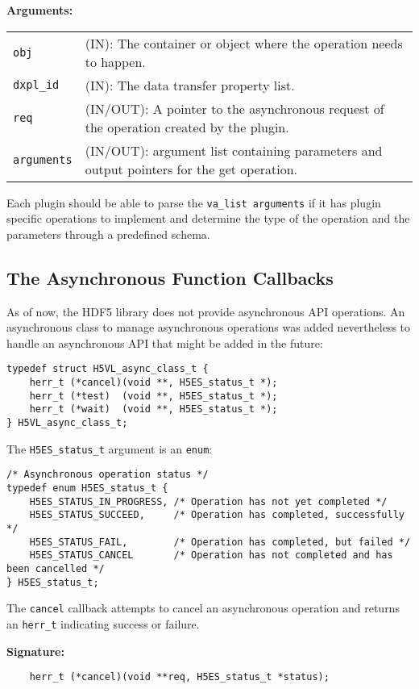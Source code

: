 \textbf{Arguments:}\\
\begin{tabular}{l p{10cm}}
  {\tt obj} & (IN): The container or object where the operation needs to happen.\\
  {\tt dxpl\_id} & (IN): The data transfer property list.\\
  {\tt req} & (IN/OUT): A pointer to the asynchronous request of the operation created by the plugin.\\
  {\tt arguments} & (IN/OUT): argument list containing parameters and output pointers for the get operation. \\
\end{tabular}

Each plugin should be able to parse the {\tt va\_list arguments} if it has plugin specific operations to implement and determine the type of the operation and the parameters through a predefined schema. 

\subsection{The Asynchronous Function Callbacks}
As of now, the HDF5 library does not provide asynchronous API
operations. An asynchronous class to manage asynchronous operations
was added nevertheless to handle an asynchronous API that might be
added in the future:

\begin{lstlisting}
typedef struct H5VL_async_class_t {
    herr_t (*cancel)(void **, H5ES_status_t *);
    herr_t (*test)  (void **, H5ES_status_t *);
    herr_t (*wait)  (void **, H5ES_status_t *);
} H5VL_async_class_t;
\end{lstlisting}

The {\tt H5ES\_status\_t} argument is an {\tt enum}:
\begin{lstlisting}
/* Asynchronous operation status */
typedef enum H5ES_status_t {
    H5ES_STATUS_IN_PROGRESS, /* Operation has not yet completed */
    H5ES_STATUS_SUCCEED,     /* Operation has completed, successfully */
    H5ES_STATUS_FAIL,        /* Operation has completed, but failed */
    H5ES_STATUS_CANCEL       /* Operation has not completed and has been cancelled */
} H5ES_status_t;
\end{lstlisting}

The {\tt cancel} callback attempts to cancel an asynchronous operation
and returns an {\tt herr\_t} indicating success or failure.

\textbf{Signature:}
\begin{lstlisting}
    herr_t (*cancel)(void **req, H5ES_status_t *status);
\end{lstlisting}

